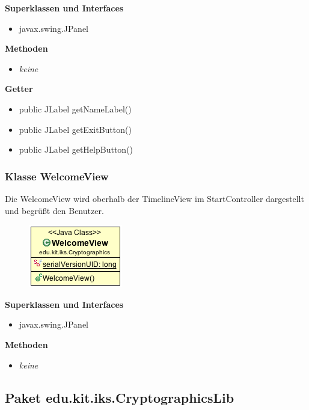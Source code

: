 \documentclass{article}
\begin{document}
      \textbf{Superklassen und Interfaces}
      \begin{itemize}
        \item javax.swing.JPanel
      \end{itemize}
      
      \textbf{Methoden}
      \begin{itemize}
        \item \textit{keine}
      \end{itemize}

      \textbf{Getter}
      \begin{itemize}
        \item public JLabel getNameLabel()
        \item public JLabel getExitButton()
        \item public JLabel getHelpButton()
      \end{itemize}

    \subsubsection{Klasse WelcomeView}
      Die WelcomeView wird oberhalb der TimelineView im StartController dargestellt und begrüßt den Benutzer.
      \begin{figure}[H]
        \centering
        \includegraphics{resources/edu-kit-iks-Cryptographics-WelcomeView}
      \end{figure}

      \textbf{Superklassen und Interfaces}
      \begin{itemize}
        \item javax.swing.JPanel
      \end{itemize}
      
      \textbf{Methoden}
      \begin{itemize}
        \item \textit{keine}
      \end{itemize}

  \subsection{Paket edu.kit.iks.CryptographicsLib}
    
\end{document}
